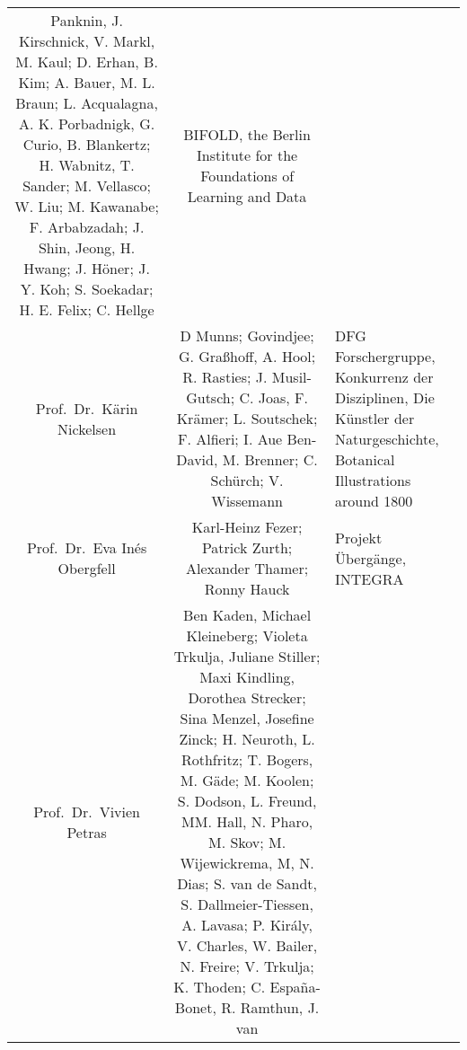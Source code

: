 \documentclass[
]{article}
\begin{document}
\begin{longtable}[]{@{}ccl@{}}
\begin{minipage}[t]{0.37\columnwidth}
Panknin, J. Kirschnick, V. Markl, M. Kaul; D. Erhan, B. Kim; A. Bauer,
M. L. Braun; L. Acqualagna, A. K. Porbadnigk, G. Curio, B. Blankertz; H.
Wabnitz, T. Sander; M. Vellasco; W. Liu; M. Kawanabe; F. Arbabzadah; J.
Shin, Jeong, H. Hwang; J. Höner; J. Y. Koh; S. Soekadar; H. E. Felix; C.
Hellge\strut
\end{minipage} & \begin{minipage}[t]{0.37\columnwidth}\raggedright
BIFOLD, the Berlin Institute for the Foundations of Learning and
Data\strut
\end{minipage}\tabularnewline
\begin{minipage}[t]{0.18\columnwidth}\centering
Prof.~Dr.~Kärin Nickelsen\strut
\end{minipage} & \begin{minipage}[t]{0.37\columnwidth}\centering
D Munns; Govindjee; G. Graßhoff, A. Hool; R. Rasties; J. Musil-Gutsch;
C. Joas, F. Krämer; L. Soutschek; F. Alfieri; I. Aue Ben-David, M.
Brenner; C. Schürch; V. Wissemann\strut
\end{minipage} & \begin{minipage}[t]{0.37\columnwidth}\raggedright
DFG Forschergruppe, Konkurrenz der Disziplinen, Die Künstler der
Naturgeschichte, Botanical Illustrations around 1800\strut
\end{minipage}\tabularnewline
\begin{minipage}[t]{0.18\columnwidth}\centering
Prof.~Dr.~Eva Inés Obergfell\strut
\end{minipage} & \begin{minipage}[t]{0.37\columnwidth}\centering
Karl-Heinz Fezer; Patrick Zurth; Alexander Thamer; Ronny Hauck\strut
\end{minipage} & \begin{minipage}[t]{0.37\columnwidth}\raggedright
Projekt Übergänge, INTEGRA\strut
\end{minipage}\tabularnewline
\begin{minipage}[t]{0.18\columnwidth}\centering
Prof.~Dr.~Vivien Petras\strut
\end{minipage} & \begin{minipage}[t]{0.37\columnwidth}\centering
Ben Kaden, Michael Kleineberg; Violeta Trkulja, Juliane Stiller; Maxi
Kindling, Dorothea Strecker; Sina Menzel, Josefine Zinck; H. Neuroth, L.
Rothfritz; T. Bogers, M. Gäde; M. Koolen; S. Dodson, L. Freund, MM.
Hall, N. Pharo, M. Skov; M. Wijewickrema, M, N. Dias; S. van de Sandt,
S. Dallmeier-Tiessen, A. Lavasa; P. Király, V. Charles, W. Bailer, N.
Freire; V. Trkulja; K. Thoden; C. España-Bonet, R. Ramthun, J. van

\end{minipage}
\end{longtable}
\end{document}

